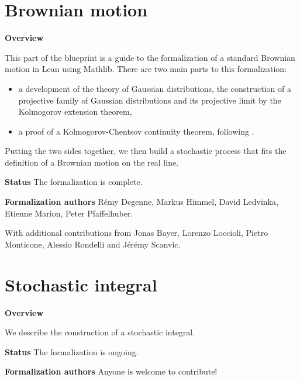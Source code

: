 %

\part{Brownian motion}

\textbf{Overview}

This part of the blueprint is a guide to the formalization of a standard Brownian motion in Lean using Mathlib. There are two main parts to this formalization:
\begin{itemize}
  \item a development of the theory of Gaussian distributions, the construction of a projective family of Gaussian distributions and its projective limit by the Kolmogorov extension theorem,
  \item a proof of a Kolmogorov-Chentsov continuity theorem, following \cite{kratschmer2023kolmogorov}.
\end{itemize}

Putting the two sides together, we then build a stochastic process that fits the definition of a Brownian motion on the real line.

\textbf{Status} The formalization is complete.

\textbf{Formalization authors} Rémy Degenne, Markus Himmel, David Ledvinka, Etienne Marion, Peter Pfaffelhuber.

With additional contributions from Jonas Bayer, Lorenzo Loccioli, Pietro Monticone, Alessio Rondelli and Jérémy Scanvic.








\putbib

\part{Stochastic integral}

\textbf{Overview}

We describe the construction of a stochastic integral.

\textbf{Status} The formalization is ongoing.

\textbf{Formalization authors} Anyone is welcome to contribute!




\putbib
